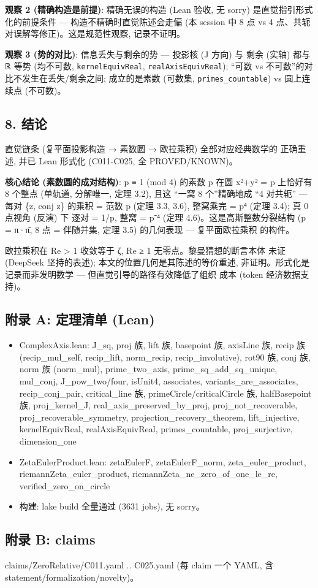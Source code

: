 \documentclass[
]{article}
\providecommand{\tightlist}{%
  \setlength{\itemsep}{0pt}\setlength{\parskip}{0pt}}
\begin{document}
\textbf{观察 2 (精确构造是前提)}: 精确无误的构造 (Lean 验收, 无 sorry)
是直觉指引形式化的前提条件 --- 构造不精确时直觉陈述会走偏 (本 session 中
8 点 vs 4 点、共轭对误解等修正)。这是规范性观察, 记录不证明。

\textbf{观察 3 (势的对比)}: 信息丢失与剩余的势 --- 投影核 (J 方向) 与
剩余 (实轴) 都与 ℝ 等势 (均不可数, \texttt{kernelEquivReal},
\texttt{realAxisEquivReal}); ``可数 vs
不可数''的对比不发生在丢失/剩余之间; 成立的是素数 (可数集,
\texttt{primes\_countable}) vs 圆上连续点 (不可数)。

\subsection{8. 结论}\label{ux7ed3ux8bba}

直觉链条 (复平面投影构造 → 素数圆 → 欧拉乘积) 全部对应经典数学的
正确重述, 并已 Lean 形式化 (C011-C025, 全 PROVED/KNOWN)。

\textbf{核心结论 (素数圆的成对结构)}: p ≡ 1 (mod 4) 的素数 p 在圆 x²+y²
= p 上恰好有 8 个整点 (单轨道, 分解唯一, 定理 3.2), 且这 ``一窝 8
个''精确地成 ``4 对共轭'' --- 每对 \{z, conj z\} 的乘积 = 范数 p (定理
3.3, 3.6), 整窝乘完 = p⁴ (定理 3.4); 真 0 点视角 (反演) 下 逐对 = 1/p,
整窝 = p⁻⁴ (定理 4.6)。这是高斯整数分裂结构 (p = π·π̄, 8 点 = 伴随并集,
定理 3.5) 的几何表现 --- 复平面欧拉乘积 的构件。

欧拉乘积在 Re \textgreater{} 1 收敛等于 ζ, Re ≥ 1
无零点。黎曼猜想的断言本体 未证 (DeepSeek 坚持的表述);
本文的位置几何是其陈述的等价重述, 非证明。形式化是记录而非发明数学 ---
但直觉引导的路径有效降低了组织 成本 (token 经济数据支持)。

\subsection{附录 A: 定理清单
(Lean)}\label{ux9644ux5f55-a-ux5b9aux7406ux6e05ux5355-lean}

\begin{itemize}
\tightlist
\item
  ComplexAxis.lean: J\_sq, proj 族, lift 族, basepoint 族, axisLine 族,
  recip 族 (recip\_mul\_self, recip\_lift, norm\_recip,
  recip\_involutive), rot90 族, conj 族, norm 族 (norm\_mul),
  prime\_two\_axis, prime\_sq\_add\_sq\_unique, mul\_conj,
  J\_pow\_two/four, isUnit4, associates, variants\_are\_associates,
  recip\_conj\_pair, critical\_line 族, primeCircle/criticalCircle 族,
  halfBasepoint 族, proj\_kernel\_J, real\_axis\_preserved\_by\_proj,
  proj\_not\_recoverable, proj\_recoverable\_symmetry,
  projection\_recovery\_theorem, lift\_injective, kernelEquivReal,
  realAxisEquivReal, primes\_countable, proj\_surjective, dimension\_one
\item
  ZetaEulerProduct.lean: zetaEulerF, zetaEulerF\_norm,
  zeta\_euler\_product, riemannZeta\_euler\_product,
  riemannZeta\_ne\_zero\_of\_one\_le\_re, verified\_zero\_on\_circle
\item
  构建: lake build 全量通过 (3631 jobs), 无 sorry。
\end{itemize}

\subsection{附录 B: claims}\label{ux9644ux5f55-b-claims}

claims/ZeroRelative/C011.yaml .. C025.yaml (每 claim 一个 YAML, 含
statement/formalization/novelty)。
\end{document}
